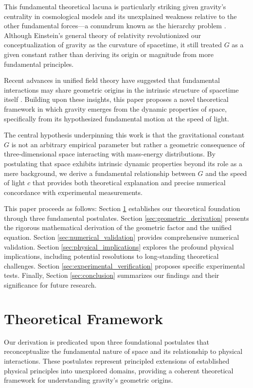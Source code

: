 \documentclass[12pt]{article}
\numberwithin{equation}{section}
\begin{document}
This fundamental theoretical lacuna is particularly striking given gravity's centrality in cosmological models and its unexplained weakness relative to the other fundamental forces—a conundrum known as the hierarchy problem \citep{wells2017hierarchy}. Although Einstein's general theory of relativity \citep{einstein1915} revolutionized our conceptualization of gravity as the curvature of spacetime, it still treated $G$ as a given constant rather than deriving its origin or magnitude from more fundamental principles.

Recent advances in unified field theory have suggested that fundamental interactions may share geometric origins in the intrinsic structure of spacetime itself \citep{zhang2020,georgi1974}. Building upon these insights, this paper proposes a novel theoretical framework in which gravity emerges from the dynamic properties of space, specifically from its hypothesized fundamental motion at the speed of light.

The central hypothesis underpinning this work is that the gravitational constant $G$ is not an arbitrary empirical parameter but rather a geometric consequence of three-dimensional space interacting with mass-energy distributions. By postulating that space exhibits intrinsic dynamic properties beyond its role as a mere background, we derive a fundamental relationship between $G$ and the speed of light $c$ that provides both theoretical explanation and precise numerical concordance with experimental measurements.

This paper proceeds as follows: Section \ref{sec:theoretical_framework} establishes our theoretical foundation through three fundamental postulates. Section \ref{sec:geometric_derivation} presents the rigorous mathematical derivation of the geometric factor and the unified equation. Section \ref{sec:numerical_validation} provides comprehensive numerical validation. Section \ref{sec:physical_implications} explores the profound physical implications, including potential resolutions to long-standing theoretical challenges. Section \ref{sec:experimental_verification} proposes specific experimental tests. Finally, Section \ref{sec:conclusion} summarizes our findings and their significance for future research.

\section{Theoretical Framework}
\label{sec:theoretical_framework}

Our derivation is predicated upon three foundational postulates that reconceptualize the fundamental nature of space and its relationship to physical interactions. These postulates represent principled extensions of established physical principles into unexplored domains, providing a coherent theoretical framework for understanding gravity's geometric origins.
\end{document}
